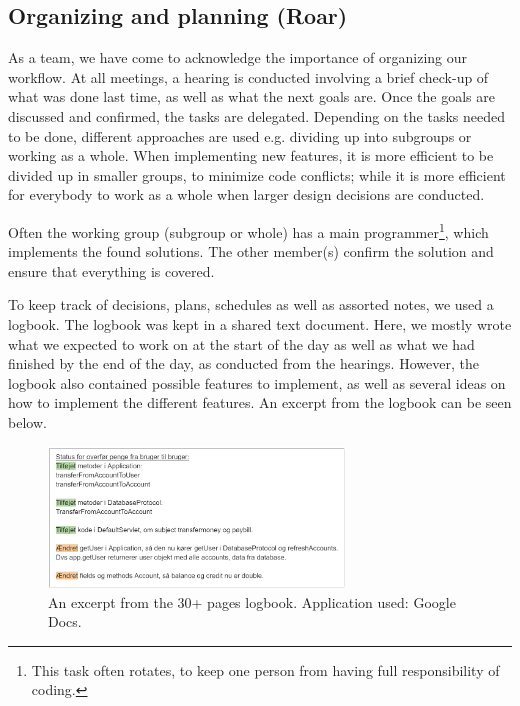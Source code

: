 \subsection{Organizing and planning (Roar)}

As a team, we have come to acknowledge the importance of organizing our workflow. At all meetings, a hearing is conducted involving a brief check-up of what was done last time, as well as what the next goals are. Once the goals are discussed and confirmed, the tasks are delegated. Depending on the tasks needed to be done, different approaches are used e.g. dividing up into subgroups or working as a whole. When implementing new features, it is more efficient to be divided up in smaller groups, to minimize code conflicts; while it is more efficient for everybody to work as a whole when larger design decisions are conducted. 

Often the working group (subgroup or whole) has a main programmer\footnote{This task often rotates, to keep one person from having full responsibility of coding.}, which implements the found solutions. The other member(s) confirm the solution and ensure that everything is covered.

To keep track of decisions, plans, schedules as well as assorted notes, we used a logbook. The logbook was kept in a shared text document. Here, we mostly wrote what we expected to work on at the start of the day as well as what we had finished by the end of the day, as conducted from the hearings. However, the logbook also contained possible features to implement, as well as several ideas on how to implement the different features. An excerpt from the logbook can be seen below.

\begin{figure}[H]
    \centering
    \includegraphics[width=0.7\textwidth]{figures/logbook2.PNG}
    \caption{An excerpt from the 30+ pages logbook. Application used: Google Docs.}
    \label{fig:logbook}
\end{figure}

